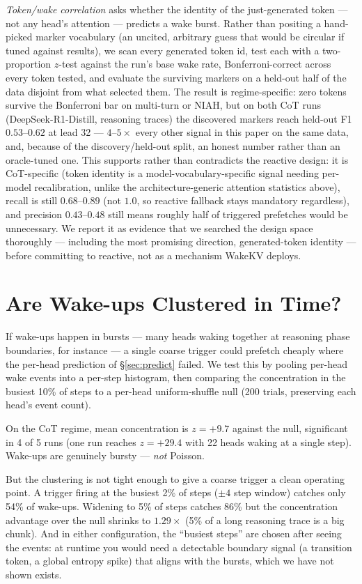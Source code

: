 \documentclass[11pt]{article}
\begin{document}
\emph{Token/wake correlation} asks whether the identity of the just-generated
token --- not any head's attention --- predicts a wake burst. Rather than
positing a hand-picked marker vocabulary (an uncited, arbitrary guess that
would be circular if tuned against results), we scan every generated
token id, test each with a two-proportion $z$-test against the run's base
wake rate, Bonferroni-correct across every token tested, and evaluate the
surviving markers on a held-out half of the data disjoint from what
selected them. The result is regime-specific: zero tokens survive the
Bonferroni bar on multi-turn or NIAH, but on both CoT runs (DeepSeek-R1-Distill,
reasoning traces) the discovered markers reach held-out F1 $0.53$--$0.62$
at lead 32 --- $4$--$5\times$ every other signal in this paper on the
same data, and, because of the discovery/held-out split, an honest number
rather than an oracle-tuned one. This supports rather than contradicts
the reactive design: it is CoT-specific (token identity is a
model-vocabulary-specific signal needing per-model recalibration, unlike
the architecture-generic attention statistics above), recall is still
$0.68$--$0.89$ (not $1.0$, so reactive fallback stays mandatory
regardless), and precision $0.43$--$0.48$ still means roughly half of
triggered prefetches would be unnecessary. We report it as evidence that
we searched the design space thoroughly --- including the most
promising direction, generated-token identity --- before committing to
reactive, not as a mechanism WakeKV deploys.

\section{Are Wake-ups Clustered in Time?}
\label{sec:cluster}

If wake-ups happen in bursts --- many heads waking together at reasoning
phase boundaries, for instance --- a single coarse trigger could
prefetch cheaply where the per-head prediction of \S\ref{sec:predict}
failed. We test this by pooling per-head wake events into a per-step
histogram, then comparing the concentration in the busiest 10\% of
steps to a per-head uniform-shuffle null (200 trials, preserving each
head's event count).

On the CoT regime, mean concentration is $z = +9.7$ against the null,
significant in 4 of 5 runs (one run reaches $z = +29.4$ with 22 heads
waking at a single step). Wake-ups are genuinely bursty --- \emph{not}
Poisson.

But the clustering is not tight enough to give a coarse trigger a
clean operating point. A trigger firing at the busiest 2\% of steps
($\pm 4$ step window) catches only 54\% of wake-ups. Widening to 5\%
of steps catches 86\% but the concentration advantage over the null
shrinks to $1.29\times$ (5\% of a long reasoning trace is a big chunk).
And in either configuration, the ``busiest steps'' are chosen after
seeing the events: at runtime you would need a detectable boundary
signal (a transition token, a global entropy spike) that aligns with
the bursts, which we have not shown exists.
\end{document}
